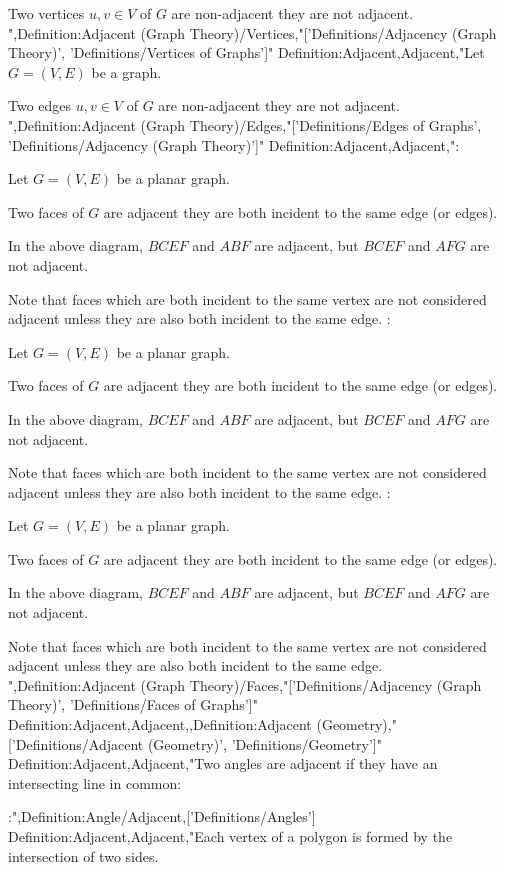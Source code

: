 Two vertices $u, v \in V$ of $G$ are non-adjacent  they are not adjacent.
",Definition:Adjacent (Graph Theory)/Vertices,"['Definitions/Adjacency (Graph Theory)', 'Definitions/Vertices of Graphs']"
Definition:Adjacent,Adjacent,"Let $G = \left( V, E \right)$ be a graph.

Two edges $u, v \in V$ of $G$ are non-adjacent  they are not adjacent.
",Definition:Adjacent (Graph Theory)/Edges,"['Definitions/Edges of Graphs', 'Definitions/Adjacency (Graph Theory)']"
Definition:Adjacent,Adjacent,":

Let $G = \left( V, E \right)$ be a planar graph.

Two faces of $G$ are adjacent  they are both incident to the same edge (or edges).

In the above diagram, $BCEF$ and $ABF$ are adjacent, but $BCEF$ and $AFG$ are not adjacent.


Note that faces which are both incident to the same vertex are not considered adjacent unless they are also both incident to the same edge.
:

Let $G = \left( V, E \right)$ be a planar graph.

Two faces of $G$ are adjacent  they are both incident to the same edge (or edges).

In the above diagram, $BCEF$ and $ABF$ are adjacent, but $BCEF$ and $AFG$ are not adjacent.


Note that faces which are both incident to the same vertex are not considered adjacent unless they are also both incident to the same edge.
:

Let $G = \left( V, E \right)$ be a planar graph.

Two faces of $G$ are adjacent  they are both incident to the same edge (or edges).

In the above diagram, $BCEF$ and $ABF$ are adjacent, but $BCEF$ and $AFG$ are not adjacent.


Note that faces which are both incident to the same vertex are not considered adjacent unless they are also both incident to the same edge.
",Definition:Adjacent (Graph Theory)/Faces,"['Definitions/Adjacency (Graph Theory)', 'Definitions/Faces of Graphs']"
Definition:Adjacent,Adjacent,,Definition:Adjacent (Geometry),"['Definitions/Adjacent (Geometry)', 'Definitions/Geometry']"
Definition:Adjacent,Adjacent,"Two angles are adjacent if they have an intersecting line in common:

:",Definition:Angle/Adjacent,['Definitions/Angles']
Definition:Adjacent,Adjacent,"Each vertex of a polygon is formed by the intersection of two sides.

